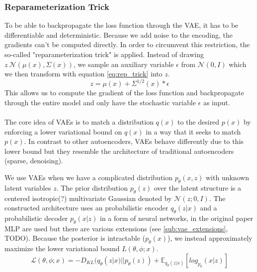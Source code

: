 \subsubsection{Reparameterization Trick}
To be able to backpropagate the loss function through the VAE, it has to be differentiable and deterministic.
Because we add noise to the encoding, the gradients can't be computed directly. In order to circumvent this restriction, the so-called "reparameterization trick" is applied.
Instead of drawing $z ~ \mathcal{N}(\mu(x), \Sigma(x))$, we sample an auxiliary variable $\epsilon$ from $\mathcal{N}(0, I)$ which we then transform with equation \ref{eq:rep_trick} into $z$.
\begin{equation}
  \label{eq:rep_trick}
  z = \mu(x) + \Sigma^{1/2}(x)*\epsilon
\end{equation}
This allows us to compute the gradient of the loss function and backpropagate through the entire model and only have the stochastic variable $\epsilon$ as input.\\\\

The core idea of VAEs is to match a distribution $q(x)$ to the desired $p(x)$ by enforcing a lower variational bound on $q(x)$ in a way that it seeks to match $p(x)$.
In contrast to other autoencoders, VAEs behave differently due to this lower bound but they resemble the architecture of traditional autoencoders (sparse, denoising).




We use VAEs when we have a complicated distribution $p_\theta(x,z)$ with unknown latent variables $z$.
The prior distribution $p_\theta(z)$ over the latent structure is a centered isotropic(?) multivariate Gaussian denoted by $\mathcal{N}(z;0, I)$.
The constructed architecture uses an probabilistic encoder $q_\theta(z|x)$ and a probabilistic decoder $p_\theta(x|z)$ in a form of neural networks, in the original paper MLP are used\cite{vae:2013} but there are various extensions (see \ref{sub:vae_extensions}, TODO).
Because the posterior is intractable ($p_\theta(x)$), we instead approximately maximize the lower variational bound $L(\theta,\phi;x)$.\\
\begin{equation}
  \mathcal{L}(\theta,\phi;x) = -D_{KL}(q_\theta(z|x)||p_\theta(z)) + \mathbb{E}_{q_\theta(z|x)}[log_{p_\theta}(x|z)]
\end{equation}




